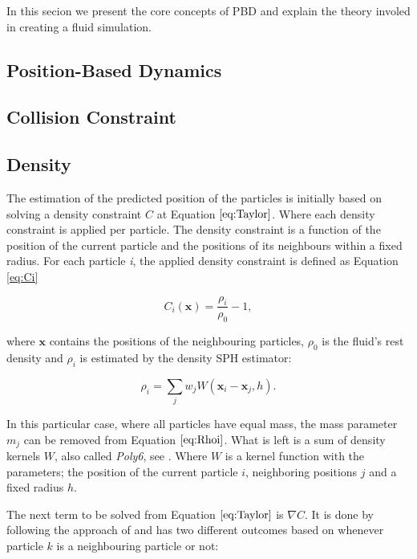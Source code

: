 In this secion we present the core concepts of PBD and
explain the theory involed in creating a fluid simulation.

\subsection{Position-Based Dynamics}



\subsection{Collision Constraint}


\subsection{Density}

The estimation of the predicted position of the particles is initially based on
solving a density constraint $C$ at Equation $\ref{eq:Taylor}$. Where each
density constraint is applied per particle. The density constraint is a
function of the position of the current particle and the positions of its
neighbours within a fixed radius. For each particle \textit{i}, the applied
density constraint is defined as Equation \ref{eq:Ci}

\begin{equation}
\label{eq:Ci}
C_i(\mathbf{x}) = \frac{\rho_i}{\rho_0} - 1,
\end{equation}

where $\mathbf{x}$ contains the positions of the neighbouring particles,
$\rho_0$ is the fluid's rest density and $\rho_i$ is estimated by the density
SPH estimator:

\begin{equation}
\label{eq:Rhoi}
\rho_i = \sum\limits_{j} w_j W(\mathbf{x}_i - \mathbf{x}_j, h).
\end{equation}

In this particular case, where all particles have equal mass, the mass
parameter $m_j$ can be removed from Equation $\ref{eq:Rhoi}$. What is left is a
sum of density kernels $W$, also called \textit{Poly6}, see
\cite{muller2003particle}. Where $W$ is a kernel function with the parameters;
the position of the current particle  $i$, neighboring positions $j$ and a
fixed radius $h$.

The next term to be solved from Equation $\ref{eq:Taylor}$ is $\nabla C$. It is
done by following the approach of \cite{macklin2013position} and has two different outcomes based on whenever particle $k$ is a neighbouring particle or not:

